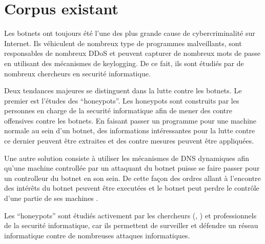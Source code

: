 \section{Corpus existant}

Les botnets ont toujours été l'une des plus grande cause de cybercriminalité sur
Internet. Ils véhiculent de nombreux type de programmes malveillants, sont responsables
de nombreux DDoS et peuvent capturer de nombreux mots de passe en utilisant des mécanismes
de keylogging. De ce fait, ils sont étudiés par de nombreux chercheurs en securité informatique.

Deux tendances majeures se distinguent dans la lutte contre les botnets.
Le premier est l'études des ``honeypots''. Les honeypots sont construits par les
personnes en charge de la securité informatique afin de mener des contre offensives
contre les botnets. En faisant passer un programme pour une machine normale au sein
d'un botnet, des informations intéressantes pour la lutte contre ce dernier peuvent
être extraites et des contre mesures peuvent être appliquées.

Une autre solution consiste à utiliser les mécanismes de DNS dynamiques
afin qu'une machine controllée par un attaquant du botnet puisse se faire
passer pour un controlleur du botnet en son sein. De cette façon des ordres
allant à l'encontre des intérêts du botnet peuvent être executées et le botnet
peut perdre le contrôle d'une partie de ses machines \cite{botnet-timezone}.


Les ``honeypots'' sont étudiés activement par les chercheurs
(\cite{honeypot-framework}, \cite{honeypot-hybrid}) et professionnels de
la securité informatique, car ils permettent de surveiller et défendre
un réseau informatique contre de nombreuses attaques informatiques.
